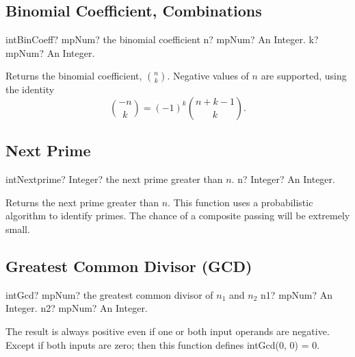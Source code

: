 \subsection{Binomial Coefficient, Combinations}

\begin{mpFunctionsExtract}
	\mpFunctionTwo
	{intBinCoeff? mpNum? the binomial coefficient}
	{n? mpNum? An Integer.}
	{k? mpNum? An Integer.}
\end{mpFunctionsExtract}

\vspace{0.3cm}
Returns the binomial coefficient, $\binom{n}{k}$. Negative values of $n$ are supported, using the identity
\begin{equation}
	\binom{-n}{k} = (-1)^k \binom{n+k-1}{k}.
\end{equation}





\subsection{Next Prime}

\begin{mpFunctionsExtract}
	\mpFunctionOne
	{intNextprime? Integer?  the next prime greater than $n$.}
	{n? Integer? An Integer.}
\end{mpFunctionsExtract}

\vspace{0.3cm}
Returns the next prime greater than $n$. This function uses a probabilistic algorithm to identify primes. The chance of a composite passing will be extremely small.



\subsection{Greatest Common Divisor (GCD)}

\begin{mpFunctionsExtract}
	\mpFunctionTwo
	{intGcd? mpNum? the greatest common divisor of $n_1$ and $n_2$}
	{n1? mpNum? An Integer.}
	{n2? mpNum? An Integer.}
\end{mpFunctionsExtract}


\vspace{0.3cm}
The result is always positive even if
one or both input operands are negative. Except if both inputs are zero; then this function
defines \textsf{intGcd}(0, 0) = 0.



